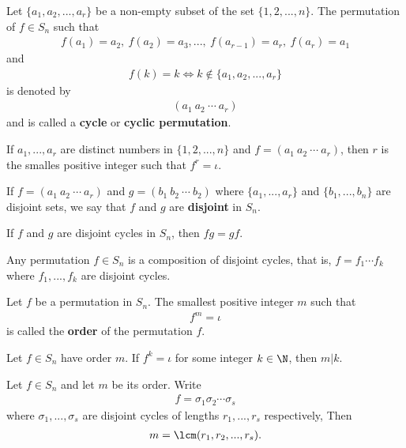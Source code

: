 \documentclass{article}
\begin{document}
\begin{definition}
    Let $\{a_1, a_2, ...,a_r\}$ be a non-empty subset of the set $\{1,2,...,n\}$. The permutation of $f\in S_n$ such that
    \begin{align*}
        f(a_1)=a_2,\: f(a_2)=a_3,...,\: f(a_{r-1})=a_r,\: f(a_r)=a_1
    \end{align*}
    and 
    \begin{align*}
        f(k)=k \Leftrightarrow k\not\in \{a_1,a_2,...,a_r\}
    \end{align*}
    is denoted by
    \begin{align*}
        (a_1\:a_2\:\cdots\:a_r)
    \end{align*}
    and is called a \textbf{cycle} or \textbf{cyclic permutation}.
\end{definition}
\begin{corollary}
    If $a_1, ..., a_r$ are distinct numbers in $\{1,2,...,n\}$ and $f=(a_1\: a_2\: \cdots \: a_r)$, then $r$ is the smalles positive integer such that $f^r=\iota$.
\end{corollary}
\begin{definition}
    If $f=(a_1\:a_2\:\cdots\: a_r)$ and $g=(b_1\:b_2\:\cdots\:b_2)$ where $\{a_1,...,a_r\}$ and $\{b_1,..., b_n\}$ are disjoint sets, we say that $f$ and $g$ are \textbf{disjoint} in $S_n$.
\end{definition}
\begin{proposition}
    If $f$ and $g$ are disjoint cycles in $S_n$, then $fg=gf$.    
\end{proposition}
\begin{theorem}
    Any permutation $f\in S_n$ is a composition of disjoint cycles, that is, $f=f_1\cdots f_k$ where $f_1,...,f_k$ are disjoint cycles.
\end{theorem}
\begin{definition}
    Let $f$ be a permutation in $S_n$. The smallest positive integer $m$ such that
    \begin{align*}
        f^m = \iota
    \end{align*}
    is called the \textbf{order} of the permutation $f$.
\end{definition}
\begin{lemma}
    Let $f\in S_n$ have order $m$. If $f^k=\iota$ for some integer $k\in\N$, then $m|k$.
\end{lemma}
\begin{lemma}
    Let $f\in S_n$ and let $m$ be its order. Write
    \begin{align*}
        f=\sigma_1\sigma_2\cdots \sigma_s
    \end{align*}
    where $\sigma_1,...,\sigma_s$ are disjoint cycles of lengths $r_1, ..., r_s$ respectively, Then
    \begin{align*}
        m=\lcm(r_1,r_2,...,r_s).
    \end{align*}
\end{lemma}
\end{document}
